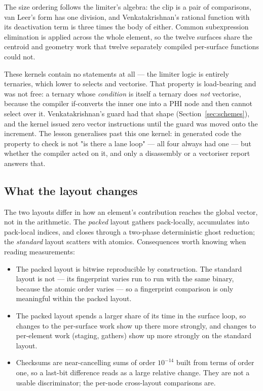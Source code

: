 The size ordering follows the limiter's algebra: the clip is a pair of comparisons, van Leer's
form has one division, and Venkatakrishnan's rational function with its deactivation term is three
times the body of either. Common subexpression elimination is applied across the whole element, so
the twelve surfaces share the centroid and geometry work that twelve separately compiled
per-surface functions could not.

These kernels contain no  statements at all --- the limiter logic is entirely ternaries,
which lower to selects and vectorise. That property is load-bearing and was not free: a ternary
whose \emph{condition} is itself a ternary does \emph{not} vectorise, because the compiler
if-converts the inner one into a PHI node and then cannot select over it. Venkatakrishnan's guard
had that shape (Section~\ref{sec:schemes}), and the kernel issued zero vector instructions until
the guard was moved onto the increment. The lesson generalises past this one kernel: in generated
code the property to check is not "is there a lane loop" --- all four always had one --- but
whether the compiler acted on it, and only a disassembly or a vectoriser report answers that.

\subsection{What the layout changes}

The two layouts differ in how an element's contribution reaches the global vector, not in the
arithmetic. The \emph{packed} layout gathers pack-locally, accumulates into pack-local
indices, and closes through a two-phase deterministic ghost reduction; the \emph{standard}
layout scatters with atomics. Consequences worth knowing when reading measurements:

\begin{itemize}
\item The packed layout is bitwise reproducible by construction. The standard layout is not ---
      its fingerprint varies run to run with the same binary, because the atomic order varies ---
      so a fingerprint comparison is only meaningful within the packed layout.
\item The packed layout spends a larger share of its time in the surface loop, so changes to the
      per-surface work show up there more strongly, and changes to per-element work (staging,
      gathers) show up more strongly on the standard layout.
\item Checksums are near-cancelling sums of order $10^{-14}$ built from terms of order one, so a
      last-bit difference reads as a large relative change. They are not a usable discriminator;
      the per-node cross-layout comparisons are.
\end{itemize}
